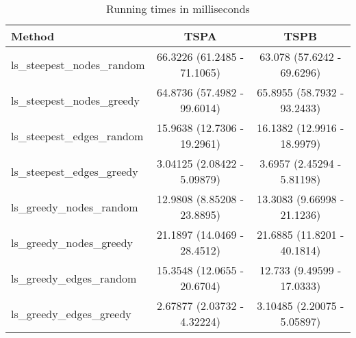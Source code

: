 \begin{table}[!htbp]
\centering
\caption{Running times in milliseconds}
\begin{tabular}{lcc}
\hline
 Method & TSPA & TSPB \\
\hline
ls\_steepest\_nodes\_random & 66.3226 (61.2485 - 71.1065) & 63.078 (57.6242 - 69.6296) \\
ls\_steepest\_nodes\_greedy & 64.8736 (57.4982 - 99.6014) & 65.8955 (58.7932 - 93.2433) \\
ls\_steepest\_edges\_random & 15.9638 (12.7306 - 19.2961) & 16.1382 (12.9916 - 18.9979) \\
ls\_steepest\_edges\_greedy & 3.04125 (2.08422 - 5.09879) & 3.6957 (2.45294 - 5.81198) \\
ls\_greedy\_nodes\_random & 12.9808 (8.85208 - 23.8895) & 13.3083 (9.66998 - 21.1236) \\
ls\_greedy\_nodes\_greedy & 21.1897 (14.0469 - 28.4512) & 21.6885 (11.8201 - 40.1814) \\
ls\_greedy\_edges\_random & 15.3548 (12.0655 - 20.6704) & 12.733 (9.49599 - 17.0333) \\
ls\_greedy\_edges\_greedy & 2.67877 (2.03732 - 4.32224) & 3.10485 (2.20075 - 5.05897) \\
\hline
\end{tabular}
\end{table}
